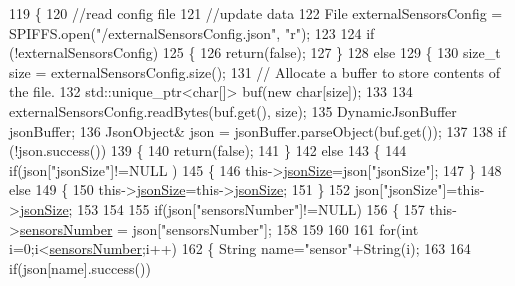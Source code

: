 \begin{DoxyCode}
119 \{
120     \textcolor{comment}{//read config file}
121     \textcolor{comment}{//update data}
122     File externalSensorsConfig = SPIFFS.open(\textcolor{stringliteral}{"/externalSensorsConfig.json"}, \textcolor{stringliteral}{"r"});
123 
124     \textcolor{keywordflow}{if} (!externalSensorsConfig) 
125     \{
126         \textcolor{keywordflow}{return}(\textcolor{keyword}{false});
127     \}
128     \textcolor{keywordflow}{else}
129     \{
130         \textcolor{keywordtype}{size\_t} size = externalSensorsConfig.size();
131         \textcolor{comment}{// Allocate a buffer to store contents of the file.}
132         std::unique\_ptr<char[]> buf(\textcolor{keyword}{new} \textcolor{keywordtype}{char}[size]);
133 
134         externalSensorsConfig.readBytes(buf.get(), size);
135         DynamicJsonBuffer jsonBuffer;
136         JsonObject& json = jsonBuffer.parseObject(buf.get());
137 
138         \textcolor{keywordflow}{if} (!json.success()) 
139         \{
140               \textcolor{keywordflow}{return}(\textcolor{keyword}{false});
141         \} 
142         \textcolor{keywordflow}{else}
143         \{   
144             \textcolor{keywordflow}{if}(json[\textcolor{stringliteral}{"jsonSize"}]!=NULL )
145             \{           
146                 this->\hyperlink{classExternalSensors_acacea86d74d967b57fcff282d26cff57}{jsonSize}=json[\textcolor{stringliteral}{"jsonSize"}];
147             \}
148             \textcolor{keywordflow}{else}
149             \{
150                 this->\hyperlink{classExternalSensors_acacea86d74d967b57fcff282d26cff57}{jsonSize}=this->\hyperlink{classExternalSensors_acacea86d74d967b57fcff282d26cff57}{jsonSize};
151             \}
152             json[\textcolor{stringliteral}{"jsonSize"}]=this->\hyperlink{classExternalSensors_acacea86d74d967b57fcff282d26cff57}{jsonSize};            
153 
154             
155             \textcolor{keywordflow}{if}(json[\textcolor{stringliteral}{"sensorsNumber"}]!=NULL)
156             \{
157                 this->\hyperlink{classExternalSensors_a58e4fbf9adeae787d92be5fa33043b5d}{sensorsNumber} = json[\textcolor{stringliteral}{"sensorsNumber"}];
158                 
159                 
160 
161                 \textcolor{keywordflow}{for}(\textcolor{keywordtype}{int} i=0;i<\hyperlink{classExternalSensors_a58e4fbf9adeae787d92be5fa33043b5d}{sensorsNumber};i++)
162                 \{   String name=\textcolor{stringliteral}{"sensor"}+String(i);
163                     
164                     \textcolor{keywordflow}{if}(json[name].success())

\end{DoxyCode}

